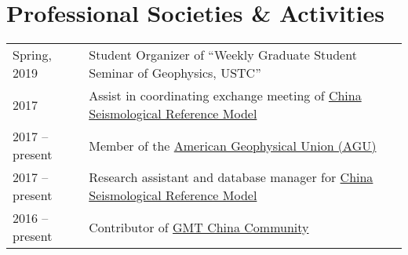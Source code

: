 \section*{Professional Societies \& Activities}

\begin{tabular}{ll}
Spring, 2019    & Student Organizer of “Weekly Graduate Student Seminar of Geophysics, USTC” \\
2017            & Assist in coordinating exchange meeting of \href{http://chinageorefmodel.org/}{China Seismological Reference Model} \\ 
2017 -- present & Member of the \href{https://sites.agu.org/}{American Geophysical Union (AGU)} \\
2017 -- present & Research assistant and database manager for \href{http://chinageorefmodel.org/}{China Seismological Reference Model} \\
2016 -- present & Contributor of \href{http://gmt-china.org/}{GMT China Community} \\
\end{tabular}
